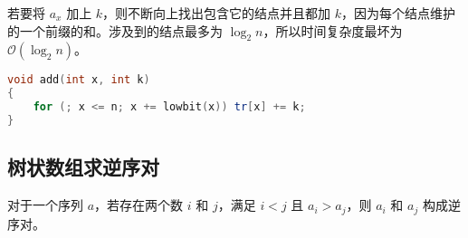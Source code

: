 若要将 $a_x$ 加上 $k$，则不断向上找出包含它的结点并且都加 $k$，因为每个结点维护的一个前缀的和。涉及到的结点最多为 $\log_2 n$，所以时间复杂度最坏为 $\mathcal{O}(\log_2 n)$。

\begin{lstlisting}[language=cpp]
void add(int x, int k)
{
    for (; x <= n; x += lowbit(x)) tr[x] += k;
}
\end{lstlisting}

\subsection{树状数组求逆序对}

对于一个序列 $a$，若存在两个数 $i$ 和 $j$，满足 $i < j$ 且 $a_i > a_j$，则 $a_i$ 和 $a_j$ 构成逆序对。